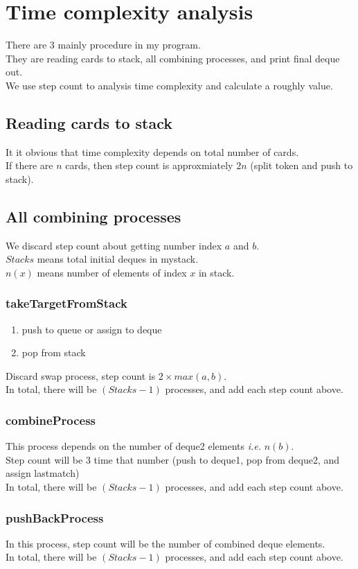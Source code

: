 \documentclass[12pt]{article}
\begin{document}
\section{Time complexity analysis}
There are 3 mainly procedure in my program.\\
They are reading cards to stack, all combining processes, and print final deque out.\\
We use step count to analysis time complexity and calculate a roughly value.
\subsection{Reading cards to stack}
It it obvious that time complexity depends on total number of cards.\\
If there are $n$ cards, then step count is approxmiately $2n$ (split token and push to stack).
\subsection{All combining processes}
We discard step count about getting number index $a$ and $b$.\\
$Stacks$ means total initial deques in mystack.\\
$n(x)$ means number of elements of index $x$ in stack.
\subsubsection{takeTargetFromStack}
\begin{enumerate}[label=(\alph*)]
  \item push to queue or assign to deque
  \item pop from stack
\end{enumerate}
Discard swap process, step count is $2\times max(a,b)$.\\
In total, there will be $(Stacks-1)$ processes, and add each step count above.
\subsubsection{combineProcess}
This process depends on the number of deque2 elements \textit{i.e.} $n(b)$.\\
Step count will be 3 time that number (push to deque1, pop from deque2, and assign lastmatch)\\
In total, there will be $(Stacks-1)$ processes, and add each step count above.
\subsubsection{pushBackProcess}
In this process, step count will be the number of combined deque elements.\\
In total, there will be $(Stacks-1)$ processes, and add each step count above.
\end{document}
